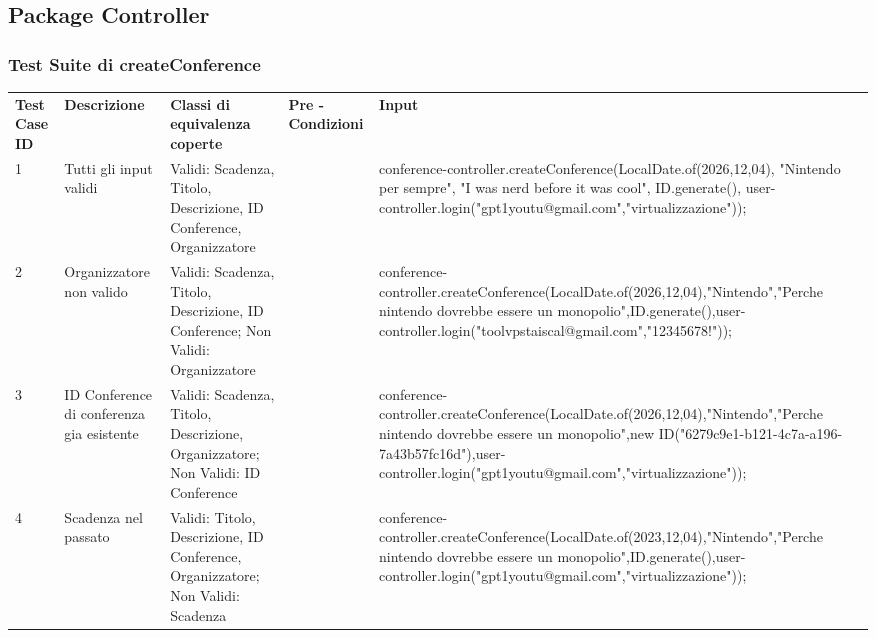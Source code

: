 \subsection{Package Controller}
\label{sec:test_funzionale_package_controller}

\subsubsection{Test Suite di createConference}
\begin{tabular}{|p{2.5cm}|p{2.5cm}|p{3cm}|p{1.5cm}|p{5cm}|}
\hline
\rowcolor{SkyBlue}
\multicolumn{5}{l}{\textbf{createConference p1}}\\
\hline
\rowcolor{Red}
\textbf{Test Case ID} & \textbf{Descrizione} & \textbf{Classi di equivalenza coperte} & \textbf{Pre - Condizioni} & \textbf{Input} \\
\hline
1&Tutti gli input validi&Validi: Scadenza, Titolo, Descrizione, ID Conference, Organizzatore &&conference-controller.createConference(LocalDate.of(2026,12,04), "Nintendo per sempre", "I was nerd before it was cool", ID.generate(), user-controller.login("gpt1youtu@gmail.com","virtualizzazione"));\\
\hline
2&Organizzatore non valido&Validi: Scadenza, Titolo, Descrizione, ID Conference; Non Validi: Organizzatore&&conference-controller.createConference(LocalDate.of(2026,12,04),"Nintendo","Perche nintendo dovrebbe essere un monopolio",ID.generate(),user-controller.login("toolvpstaiscal@gmail.com","12345678!"));\\
\hline
3&ID Conference di conferenza gia esistente&Validi: Scadenza, Titolo, Descrizione, Organizzatore; Non Validi: ID Conference &&conference-controller.createConference(LocalDate.of(2026,12,04),"Nintendo","Perche nintendo dovrebbe essere un monopolio",new ID("6279c9e1-b121-4c7a-a196-7a43b57fc16d"),user-controller.login("gpt1youtu@gmail.com","virtualizzazione"));\\
\hline
4&Scadenza nel passato&Validi: Titolo, Descrizione, ID Conference, Organizzatore; Non Validi: Scadenza  &&conference-controller.createConference(LocalDate.of(2023,12,04),"Nintendo","Perche nintendo dovrebbe essere un monopolio",ID.generate(),user-controller.login("gpt1youtu@gmail.com","virtualizzazione"));\\ 
\hline
\end{tabular}


